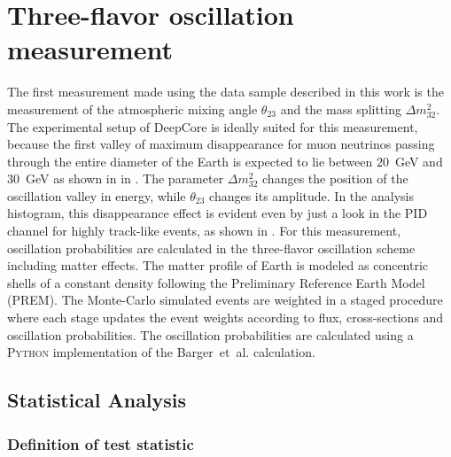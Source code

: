 \chapter{Three-flavor oscillation measurement}
\setchapterpreamble[u]{\margintoc}

The first measurement made using the data sample described in this work is the measurement of the atmospheric mixing angle $\theta_{23}$ and the mass splitting $\Delta m^2_{32}$.
The experimental setup of DeepCore is ideally suited for this measurement, because the first valley of maximum disappearance for muon neutrinos passing through the entire diameter of the Earth is expected to lie between 20~GeV and 30~GeV as shown in  in .
The parameter $\Delta m^2_{32}$ changes the position of the oscillation valley in energy, while $\theta_{23}$ changes its amplitude.
In the analysis histogram, this disappearance effect is evident even by just a look in the PID channel for highly track-like events, as shown in .
For this measurement, oscillation probabilities are calculated in the three-flavor oscillation scheme including matter effects.
The matter profile of Earth is modeled as concentric shells of a constant density following the Preliminary Reference Earth Model (PREM).
The Monte-Carlo simulated events are weighted in a staged procedure where each stage updates the event weights according to flux, cross-sections and oscillation probabilities.
The oscillation probabilities are calculated using a \textsc{Python} implementation of the Barger~et~al. calculation.

%    

\section{Statistical Analysis}

\subsection{Definition of test statistic}
\label{sec:test-statistic}

